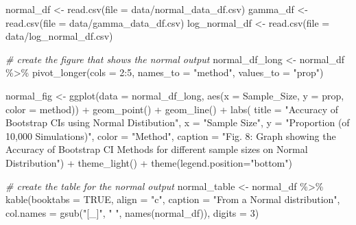 \documentclass[12pt]{article}
\newenvironment{Shaded}{\begin{snugshade}}{\end{snugshade}}
\newcommand{\AttributeTok}[1]{\textcolor[rgb]{0.77,0.63,0.00}{#1}}
\newcommand{\CommentTok}[1]{\textcolor[rgb]{0.56,0.35,0.01}{\textit{#1}}}
\newcommand{\ConstantTok}[1]{\textcolor[rgb]{0.00,0.00,0.00}{#1}}
\newcommand{\DecValTok}[1]{\textcolor[rgb]{0.00,0.00,0.81}{#1}}
\newcommand{\FunctionTok}[1]{\textcolor[rgb]{0.00,0.00,0.00}{#1}}
\newcommand{\NormalTok}[1]{#1}
\newcommand{\OtherTok}[1]{\textcolor[rgb]{0.56,0.35,0.01}{#1}}
\newcommand{\SpecialCharTok}[1]{\textcolor[rgb]{0.00,0.00,0.00}{#1}}
\newcommand{\StringTok}[1]{\textcolor[rgb]{0.31,0.60,0.02}{#1}}
\begin{document}
\begin{Shaded}
\begin{Highlighting}[]
\NormalTok{normal\_df }\OtherTok{\textless{}{-}} \FunctionTok{read.csv}\NormalTok{(}\AttributeTok{file =} \StringTok{\textquotesingle{}data/normal\_data\_df.csv\textquotesingle{}}\NormalTok{)}
\NormalTok{gamma\_df }\OtherTok{\textless{}{-}} \FunctionTok{read.csv}\NormalTok{(}\AttributeTok{file =} \StringTok{\textquotesingle{}data/gamma\_data\_df.csv\textquotesingle{}}\NormalTok{)}
\NormalTok{log\_normal\_df }\OtherTok{\textless{}{-}} \FunctionTok{read.csv}\NormalTok{(}\AttributeTok{file =} \StringTok{\textquotesingle{}data/log\_normal\_df.csv\textquotesingle{}}\NormalTok{)}

\CommentTok{\# create the figure that shows the normal output }
\NormalTok{normal\_df\_long }\OtherTok{\textless{}{-}}\NormalTok{ normal\_df }\SpecialCharTok{\%\textgreater{}\%}
  \FunctionTok{pivot\_longer}\NormalTok{(}\AttributeTok{cols =} \DecValTok{2}\SpecialCharTok{:}\DecValTok{5}\NormalTok{, }\AttributeTok{names\_to =} \StringTok{"method"}\NormalTok{, }\AttributeTok{values\_to =} \StringTok{"prop"}\NormalTok{) }
    
\NormalTok{normal\_fig }\OtherTok{\textless{}{-}} \FunctionTok{ggplot}\NormalTok{(}\AttributeTok{data =}\NormalTok{ normal\_df\_long, }
                    \FunctionTok{aes}\NormalTok{(}\AttributeTok{x =}\NormalTok{ Sample\_Size, }\AttributeTok{y =}\NormalTok{ prop, }\AttributeTok{color =}\NormalTok{ method)) }\SpecialCharTok{+} 
  \FunctionTok{geom\_point}\NormalTok{() }\SpecialCharTok{+} \FunctionTok{geom\_line}\NormalTok{() }\SpecialCharTok{+} 
  \FunctionTok{labs}\NormalTok{(}
    \AttributeTok{title =} \StringTok{"Accuracy of Bootstrap CIs using Normal Distibution"}\NormalTok{, }
    \AttributeTok{x =} \StringTok{"Sample Size"}\NormalTok{, }
    \AttributeTok{y =} \StringTok{"Proportion (of 10,000 Simulations)"}\NormalTok{, }\AttributeTok{color =} \StringTok{"Method"}\NormalTok{,}
    \AttributeTok{caption =} \StringTok{"Fig. 8: Graph showing the Accuracy of Bootstrap CI }
\StringTok{    Methods for different sample sizes on Normal Distribution"}\NormalTok{) }\SpecialCharTok{+}
  \FunctionTok{theme\_light}\NormalTok{() }\SpecialCharTok{+}
  \FunctionTok{theme}\NormalTok{(}\AttributeTok{legend.position=}\StringTok{"bottom"}\NormalTok{)}

\CommentTok{\# create the table for the normal output}
\NormalTok{normal\_table }\OtherTok{\textless{}{-}}\NormalTok{ normal\_df }\SpecialCharTok{\%\textgreater{}\%}
  \FunctionTok{kable}\NormalTok{(}\AttributeTok{booktabs =} \ConstantTok{TRUE}\NormalTok{, }\AttributeTok{align =} \StringTok{"c"}\NormalTok{, }
        \AttributeTok{caption =} \StringTok{"From a Normal distribution"}\NormalTok{, }
        \AttributeTok{col.names =} \FunctionTok{gsub}\NormalTok{(}\StringTok{"[\_]"}\NormalTok{, }\StringTok{" "}\NormalTok{, }\FunctionTok{names}\NormalTok{(normal\_df)), }\AttributeTok{digits =} \DecValTok{3}\NormalTok{)}


\end{Highlighting}
\end{Shaded}
\end{document}
